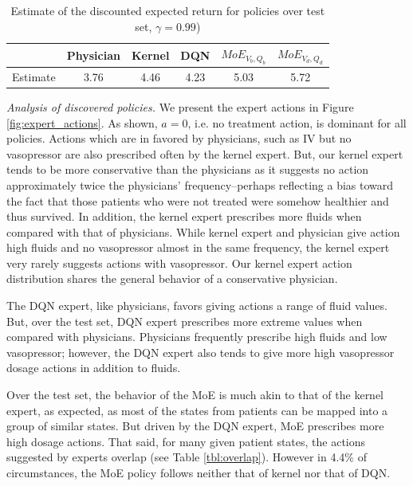 \documentclass[10pt]{amia}
\begin{document}


\begin{table}[H]
\centering
\caption{Estimate of the discounted expected return for policies over test set, $\gamma=0.99$)} 
\label{tbl:wdr}
\begin{tabular}{|c|c|c|c|c|c|}
\hline
       & Physician & Kernel & DQN  &  $MoE_{V_{b}, Q_{b}}$ & $MoE_{V_{d}, Q_{d}}$ \\ \hline
Estimate & 3.76   & 4.46  & 4.23 & 5.03 & 5.72 \\ \hline
\end{tabular}
\end{table}

\textit{Analysis of discovered policies.}
We present the expert actions in Figure \ref{fig:expert_actions}.  As shown, $a=0$, i.e. no treatment action, is dominant for all policies.  Actions which are in favored by physicians, such as IV but no vasopressor are also prescribed often by the kernel expert. But, our kernel expert tends to be more conservative than the physicians as it suggests no action approximately twice the physicians' frequency--perhaps reflecting a bias toward the fact that those patients who were not treated were somehow healthier and thus survived. In addition, the kernel expert prescribes more fluids when compared with that of physicians. While kernel expert and physician give action high fluids and no vasopressor almost in the same frequency, the kernel expert very rarely suggests actions with vasopressor. Our kernel expert action distribution shares the general behavior of a conservative physician.

The DQN expert, like physicians, favors giving actions a range of fluid values. But, over the test set, DQN expert prescribes more extreme values when compared with physicians. Physicians frequently prescribe high fluids and low vasopressor; however, the DQN expert also tends to give more high vasopressor dosage actions in addition to fluids. 

Over the test set, the behavior of the MoE is much akin to that of the kernel expert, as expected, as most of the states from patients can be mapped into a group of similar states. But driven by the DQN expert, MoE prescribes more high dosage actions. That said, for many given patient states, the actions suggested by experts overlap (see Table \ref{tbl:overlap}). However in 4.4\% of circumstances, the MoE policy follows neither that of kernel nor that of DQN.   
\end{document}
